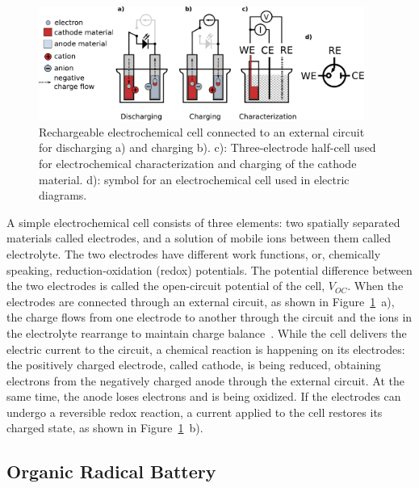 \begin{figure}[h]
\center
	\includegraphics[width=0.95\textwidth]{./electrochemistry/figures/echem_cells.pdf}
	\caption{Rechargeable electrochemical cell connected to an external circuit for discharging a) and charging b). c): Three-electrode half-cell used for electrochemical characterization and charging of the cathode material. d): symbol for an electrochemical cell used in electric diagrams.}
	\label{fig:echem_cells}
\end{figure}

A simple electrochemical cell consists of three elements: two spatially separated materials called electrodes, and a solution of mobile ions between them called electrolyte. The two electrodes have different work functions, or, chemically speaking, reduction-oxidation (redox) potentials. The potential difference between the two electrodes is called the open-circuit potential of the cell, $V_{OC}$. When the electrodes are connected through an external circuit, as shown in Figure~\ref{fig:echem_cells}~a), the charge flows from one electrode to another through the circuit and the ions in the electrolyte rearrange to maintain charge balance~\cite{muench2016_chemrev}. While the cell delivers the electric current to the circuit, a chemical reaction is happening on its electrodes: the positively charged electrode, called cathode, is being reduced, obtaining electrons from the negatively charged anode through the external circuit. At the same time, the anode loses electrons and is being oxidized. If the electrodes can undergo a reversible redox reaction, a current applied to the cell restores its charged state, as shown in Figure~\ref{fig:echem_cells}~b).\\


\subsection{Organic Radical Battery}

